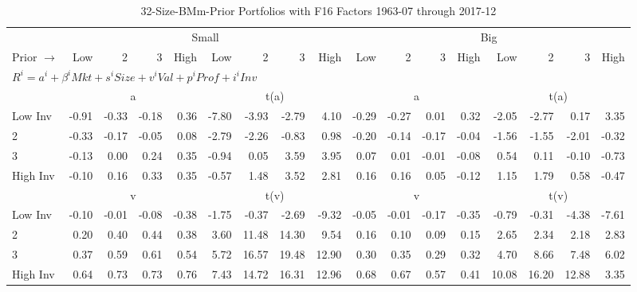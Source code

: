 
\begin{table}[!ht]
\footnotesize
\centering
\caption{32-Size-BMm-Prior Portfolios with F16 Factors 1963-07 through 2017-12}
\begin{tabular}{lrrrrrrrrrrrrrrrr}
  \toprule
    & \multicolumn{8}{c}{Small} & \multicolumn{8}{c}{Big} \\
      \cmidrule(r){2-9} \cmidrule(r){10-17}
    Prior $\rightarrow$ & Low & 2 & 3 & High & Low & 2 & 3 & High & Low & 2 & 3 & High & Low & 2 & 3 & High \\ 
  \midrule
  \multicolumn{17}{l}{$R^i=a^i+\beta^iMkt+s^iSize+v^iVal+p^iProf+i^iInv$} \\

  
    
      & \multicolumn{4}{c}{a} & \multicolumn{4}{c}{t(a)}
    
      & \multicolumn{4}{c}{a} & \multicolumn{4}{c}{t(a)}
    
    \\
      \cmidrule(r){2-5} \cmidrule(r){6-9} \cmidrule(r){10-13} \cmidrule(r){14-17}

    Low Inv   & -0.91  & -0.33  & -0.18  & 0.36  & -7.80  & -3.93  & -2.79  & 4.10  & -0.29  & -0.27  & 0.01  & 0.32  & -2.05  & -2.77  & 0.17  & 3.35  \\
           2  & -0.33  & -0.17  & -0.05  & 0.08  & -2.79  & -2.26  & -0.83  & 0.98  & -0.20  & -0.14  & -0.17  & -0.04  & -1.56  & -1.55  & -2.01  & -0.32  \\
           3  & -0.13  & 0.00  & 0.24  & 0.35  & -0.94  & 0.05  & 3.59  & 3.95  & 0.07  & 0.01  & -0.01  & -0.08  & 0.54  & 0.11  & -0.10  & -0.73  \\
    High Inv  & -0.10  & 0.16  & 0.33  & 0.35  & -0.57  & 1.48  & 3.52  & 2.81  & 0.16  & 0.16  & 0.05  & -0.12  & 1.15  & 1.79  & 0.58  & -0.47  \\

  
    
      & \multicolumn{4}{c}{v} & \multicolumn{4}{c}{t(v)}
    
      & \multicolumn{4}{c}{v} & \multicolumn{4}{c}{t(v)}
    
    \\
      \cmidrule(r){2-5} \cmidrule(r){6-9} \cmidrule(r){10-13} \cmidrule(r){14-17}

    Low Inv   & -0.10  & -0.01  & -0.08  & -0.38  & -1.75  & -0.37  & -2.69  & -9.32  & -0.05  & -0.01  & -0.17  & -0.35  & -0.79  & -0.31  & -4.38  & -7.61  \\
           2  & 0.20  & 0.40  & 0.44  & 0.38  & 3.60  & 11.48  & 14.30  & 9.54  & 0.16  & 0.10  & 0.09  & 0.15  & 2.65  & 2.34  & 2.18  & 2.83  \\
           3  & 0.37  & 0.59  & 0.61  & 0.54  & 5.72  & 16.57  & 19.48  & 12.90  & 0.30  & 0.35  & 0.29  & 0.32  & 4.70  & 8.66  & 7.48  & 6.02  \\
    High Inv  & 0.64  & 0.73  & 0.73  & 0.76  & 7.43  & 14.72  & 16.31  & 12.96  & 0.68  & 0.67  & 0.57  & 0.41  & 10.08  & 16.20  & 12.88  & 3.35  \\


\end{tabular}
\end{table}
